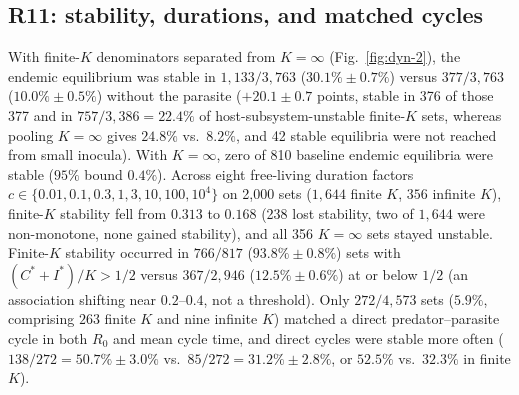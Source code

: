 \subsection{R11: stability, durations, and matched cycles}\label{esm:trim-r11-results}
With finite-$K$ denominators separated from $K = \infty$ (Fig.~\ref{fig:dyn-2}), the endemic equilibrium was stable in $1{,}133/3{,}763$ ($30.1\% \pm 0.7\%$) versus $377/3{,}763$ ($10.0\% \pm 0.5\%$) without the parasite ($+20.1 \pm 0.7$ points, stable in 376 of those 377 and in $757/3{,}386 = 22.4\%$ of host-subsystem-unstable finite-$K$ sets, whereas pooling $K = \infty$ gives $24.8\%$ vs.\ $8.2\%$, and 42 stable equilibria were not reached from small inocula). With $K = \infty$, zero of 810 baseline endemic equilibria were stable ($95\%$ bound $0.4\%$). Across eight free-living duration factors $c \in \{0.01, 0.1, 0.3, 1, 3, 10, 100, 10^4\}$ on 2,000 sets ($1{,}644$ finite $K$, $356$ infinite $K$), finite-$K$ stability fell from $0.313$ to $0.168$ (238 lost stability, two of $1{,}644$ were non-monotone, none gained stability), and all 356 $K = \infty$ sets stayed unstable. Finite-$K$ stability occurred in $766/817$ ($93.8\% \pm 0.8\%$) sets with $(C^* + I^*)/K > 1/2$ versus $367/2{,}946$ ($12.5\% \pm 0.6\%$) at or below $1/2$ (an association shifting near $0.2$--$0.4$, not a threshold). Only $272/4{,}573$ sets ($5.9\%$, comprising $263$ finite $K$ and nine infinite $K$) matched a direct predator--parasite cycle in both $R_0$ and mean cycle time, and direct cycles were stable more often ($138/272 = 50.7\% \pm 3.0\%$ vs.\ $85/272 = 31.2\% \pm 2.8\%$, or $52.5\%$ vs.\ $32.3\%$ in finite $K$).
